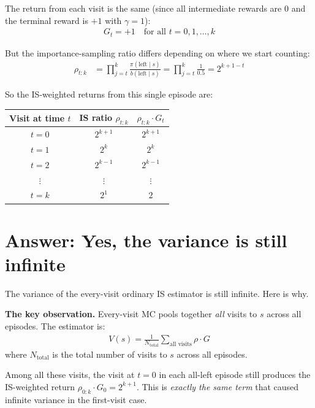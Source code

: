 \documentclass[11pt]{article}
\begin{document}
The return from each visit is the same (since all intermediate rewards are 0 and the terminal reward is $+1$ with $\gamma = 1$):
\begin{align}
    G_t = +1 \quad \text{for all } t = 0, 1, \ldots, k
\end{align}

But the importance-sampling ratio differs depending on where we start counting:
\begin{align}
    \rho_{t:k} &= \prod_{j=t}^{k} \frac{\pi(\text{left} \mid s)}{b(\text{left} \mid s)} = \prod_{j=t}^{k} \frac{1}{0.5} = 2^{k+1-t}
\end{align}

So the IS-weighted returns from this single episode are:
\begin{table}[H]
    \centering
    \begin{tabular}{ccc}
        \toprule
        \textbf{Visit at time $t$} & \textbf{IS ratio $\rho_{t:k}$} & \textbf{$\rho_{t:k} \cdot G_t$} \\
        \midrule
        $t = 0$ & $2^{k+1}$ & $2^{k+1}$ \\
        $t = 1$ & $2^{k}$ & $2^{k}$ \\
        $t = 2$ & $2^{k-1}$ & $2^{k-1}$ \\
        $\vdots$ & $\vdots$ & $\vdots$ \\
        $t = k$ & $2^{1}$ & $2$ \\
        \bottomrule
    \end{tabular}
\end{table}

\section*{Answer: Yes, the variance is still infinite}

The variance of the every-visit ordinary IS estimator is still infinite. Here is why.

\textbf{The key observation.} Every-visit MC pools together \textit{all} visits to $s$ across all episodes. The estimator is:
\begin{align}
    V(s) = \frac{1}{N_{\text{total}}} \sum_{\text{all visits}} \rho \cdot G
\end{align}
where $N_{\text{total}}$ is the total number of visits to $s$ across all episodes.

Among all these visits, the visit at $t = 0$ in each all-left episode still produces the IS-weighted return $\rho_{0:k} \cdot G_0 = 2^{k+1}$. This is \textit{exactly the same term} that caused infinite variance in the first-visit case.
\end{document}
